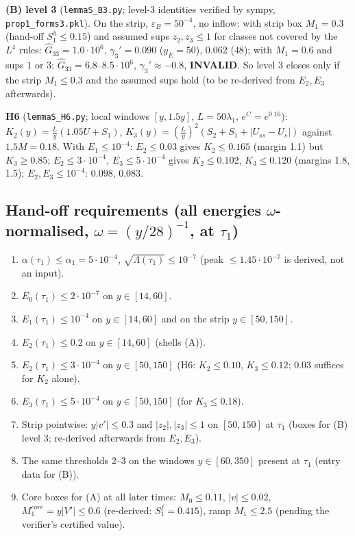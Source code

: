 \documentclass[11pt]{article}
\begin{document}
\textbf{(B) level 3} (\texttt{lemmaS\_B3.py}; level-3 identities verified by sympy, \texttt{prop1\_forms3.pkl}). On the strip, $\varepsilon_B=50^{-4}$, no inflow: with strip box $M_1=0.3$ (hand-off $S_1^h\le0.15$) and assumed sups $z_2,z_3\le1$ for classes not covered by the $L^4$ rules: $\hat G_{33}=1.0\cdot10^6$, $\gamma_3'=0.090$ ($y_E=50$), $0.062$ ($48$); with $M_1=0.6$ and sups $1$ or $3$: $\hat G_{33}=6.8$--$8.5\cdot10^6$, $\gamma_3'\approx-0.8$, \textbf{INVALID}. So level 3 closes only if the strip $M_1\le0.3$ and the assumed sups hold (to be re-derived from $E_2,E_3$ afterwards).

\textbf{H6} (\texttt{lemmaS\_H6.py}; local windows $[y,1.5y]$, $L=50\lambda_1$, $e^{C}=e^{0.16}$): $K_2(y)=\frac Ly(1.05U+S_1)$, $K_3(y)=(\frac Ly)^2(S_2+S_1+|U_{ss}-U_s|)$ against $1.5M=0.18$. With $E_1\le10^{-4}$: $E_2\le0.03$ gives $K_2\le0.165$ (margin 1.1) but $K_3\ge0.85$; $E_2\le3\cdot10^{-4}$, $E_3\le5\cdot10^{-4}$ gives $K_2\le0.102$, $K_3\le0.120$ (margins 1.8, 1.5); $E_2,E_3\le10^{-4}$: $0.098$, $0.083$.

\subsection*{Hand-off requirements (all energies $\omega$-normalised, $\omega=(y/28)^{-1}$, at $\tau_1$)}
\begin{enumerate}
\item $\alpha(\tau_1)\le\alpha_1=5\cdot10^{-4}$, $\sqrt{\Lambda(\tau_1)}\le10^{-7}$ (peak $\le1.45\cdot10^{-7}$ is derived, not an input).
\item $E_0(\tau_1)\le2\cdot10^{-7}$ on $y\in[14,60]$.
\item $E_1(\tau_1)\le10^{-4}$ on $y\in[14,60]$ and on the strip $y\in[50,150]$.
\item $E_2(\tau_1)\le0.2$ on $y\in[14,60]$ (shells (A)).
\item $E_2(\tau_1)\le3\cdot10^{-4}$ on $y\in[50,150]$ (H6: $K_2\le0.10$, $K_3\le0.12$; $0.03$ suffices for $K_2$ alone).
\item $E_3(\tau_1)\le5\cdot10^{-4}$ on $y\in[50,150]$ (for $K_3\le0.18$).
\item Strip pointwise: $y|v'|\le0.3$ and $|z_2|,|z_3|\le1$ on $[50,150]$ at $\tau_1$ (boxes for (B) level 3; re-derived afterwards from $E_2,E_3$).
\item The same thresholds 2--3 on the windows $y\in[60,350]$ present at $\tau_1$ (entry data for (B)).
\item Core boxes for (A) at all later times: $M_0\le0.11$, $|v|\le0.02$, $M_1^{core}=y|V'|\le0.6$ (re-derived: $S_1^f=0.415$), ramp $M_1\le2.5$ (pending the verifier's certified value).
\end{enumerate}
\end{document}
